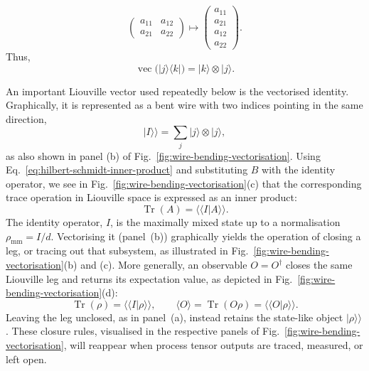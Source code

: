 %
\begin{equation}
    \begin{pmatrix}
        a_{11} & a_{12}\\
        a_{21} & a_{22}
    \end{pmatrix}
    \longmapsto
    \begin{pmatrix}
        a_{11}\\ a_{21}\\ a_{12}\\ a_{22}
    \end{pmatrix}.
    \label{eq:qubit-column-vectorisation}
\end{equation}
%
Thus,
%
\begin{equation}
    \operatorname{vec} \bigl(\lvert j\rangle\langle k\rvert\bigr)
    = \lvert k\rangle\otimes\lvert j\rangle.
\end{equation}
%

An important Liouville vector used repeatedly below is the vectorised identity.
Graphically, it is represented as a bent wire with two indices pointing in the same direction,
%
\begin{equation}
    \lvert I\rangle\!\rangle
    = \sum_j \lvert j\rangle\otimes\lvert j\rangle,
    \label{eq:vectorised-identity}
\end{equation}
%
as also shown in panel (b) of Fig.~\ref{fig:wire-bending-vectorisation}.
Using Eq.~\eqref{eq:hilbert-schmidt-inner-product} and substituting $B$ with the identity operator, we see in Fig.~\ref{fig:wire-bending-vectorisation}(c) that the corresponding trace operation in Liouville space is expressed as an inner product:
%
\begin{equation}
    \operatorname{Tr}(A)
    = \langle\!\langle I\vert A\rangle\!\rangle.
\end{equation}
%
The identity operator, \(I\), is the maximally mixed state up to a normalisation \(\rho_{\mathrm{mm}}=I/d\).
Vectorising it (panel~(b)) graphically yields the operation of closing a leg, or tracing out that subsystem, as illustrated in Fig.~\ref{fig:wire-bending-vectorisation}(b) and (c).
More generally, an observable \(O=O^\dagger\) closes the same Liouville leg and returns its expectation value, as depicted in Fig.~\ref{fig:wire-bending-vectorisation}(d):
%
\begin{equation}
    \operatorname{Tr}(\rho)
    = \langle\!\langle I\vert\rho\rangle\!\rangle, \qquad \langle O\rangle
    = \operatorname{Tr}(O\rho)
    = \langle\!\langle O\vert\rho\rangle\!\rangle.
    \label{eq:liouville-trace-expectation}
\end{equation}
%
Leaving the leg unclosed, as in panel~(a), instead retains the state-like object \(\lvert\rho\rangle\!\rangle\).
These closure rules, visualised in the respective panels of Fig.~\ref{fig:wire-bending-vectorisation}, will reappear when process tensor outputs are traced, measured, or left open.

